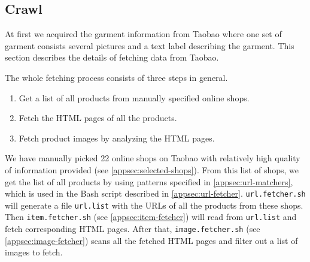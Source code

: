 \subsection{Crawl}
At first we acquired the garment information from Taobao where one set of garment consists several pictures and a text label describing the garment. 
This section describes the details of fetching data from Taobao.

The whole fetching process consists of three steps in general.
\begin{enumerate}
\item Get a list of all products from manually specified online shops.
\item Fetch the HTML pages of all the products.
\item Fetch product images by analyzing the HTML pages.
\end{enumerate}
We have manually picked 22 online shops on Taobao with relatively high quality of information provided (see \ref{appsec:selected-shops}). From this list of shops, we get the list of all products by using patterns specified in \ref{appsec:url-matchers}, which is used in the Bash script described in \ref{appsec:url-fetcher}. \texttt{url.fetcher.sh} will generate a file \texttt{url.list} with the URLs of all the products from these shops. Then \texttt{item.fetcher.sh} (see \ref{appsec:item-fetcher}) will read from \texttt{url.list} and fetch corresponding HTML pages. After that, \texttt{image.fetcher.sh} (see \ref{appsec:image-fetcher}) scans all the fetched HTML pages and filter out a list of images to fetch. 
